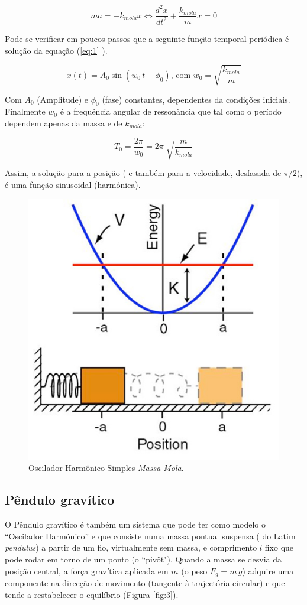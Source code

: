 \documentclass[a4paper,twoside,12pt]{article}      %
\begin{document}
\begin{equation}
	\label{eq:1} 
 m a = - k_{mola} x \Leftrightarrow \frac{d^2 x}{dt^2}  + \frac{k_{mola}}{m} x = 0
\end{equation}

Pode-se verificar em poucos passos que a seguinte função temporal periódica é solução da equação (\ref{eq:1} ).

\begin{equation}
	\label{eq:solu_mola}
x(t) = A_0 \sin(w_0 \, t + \phi_0) \text{, com } w_0 = \sqrt{\frac{k_{mola}}{m}}
\end{equation}

Com $ A_0 $ (Amplitude) e $\phi_0$ (fase) constantes, dependentes da condições iniciais. Finalmente $w_0$ é a frequência angular de ressonância que tal como o período dependem apenas da massa e de $k_{mola}$:

\begin{equation}
	\label{eq:period_mola}
T_0 = \frac{2 \pi}{w_0} = 2\pi\; \sqrt{\frac{m}{k_{mola}}}	
\end{equation}

Assim, a solução para a posição ( e também para a velocidade, desfasada de $\pi/2$), é uma função sinusoidal (harmónica).

\begin{figure}
	[!tbp] \centering 
	\includegraphics[width=0.5	\textwidth]{simple_harmonic_oscillator} 
	\caption{Oscilador Harmônico Simples \emph{Massa-Mola}.  \label{fig:2}} 
\end{figure}

\subsection{\sf Pêndulo gravítico}
O Pêndulo gravítico é também um sistema que pode ter como modelo o ``Oscilador Harmónico'' e que consiste numa massa pontual suspensa ( do Latim \emph{pendulus}) a partir de um fio, virtualmente sem massa, e comprimento $l$ fixo que pode rodar em torno de um ponto (o ``pivôt"). Quando a massa se desvia da posição central, a força gravítica aplicada em $m$ (o peso $F_g = m \, g $) adquire uma componente na direcção de movimento (tangente à trajectória circular) e que tende a restabelecer o equilíbrio (Figura \ref{fig:3}). 
\end{document}
